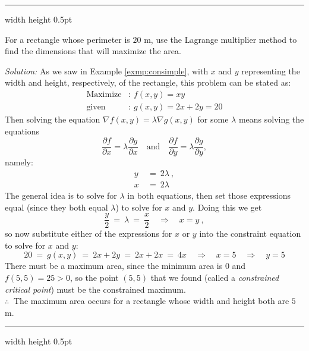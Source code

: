 \medskip
\hrule width \textwidth height 0.5pt
\begin{exmp}\label{exmp:rectlm}
 For a rectangle whose perimeter is $20$ m, use the Lagrange multiplier method to find the dimensions that will
 maximize the area.\smallskip
 \par\noindent \emph{Solution:} As we saw in Example \ref{exmp:consimple}, with $x$ and $y$ representing the width and
  height, respectively, of the rectangle, this problem can be stated as:
 \begin{align*}
  \text{Maximize}&: ~ f(x,y) = xy\\
  \text{given}&: ~ g(x,y) = 2x + 2y = 20
 \end{align*}
 Then solving the equation $\nabla f(x,y) = \lambda \nabla g(x,y)$ for some $\lambda$ means solving the equations
 \[\dfrac{\partial f}{\partial x} = \lambda \dfrac{\partial g}{\partial x}
  \quad
\text{and}
\quad
 \dfrac{\partial f}{\partial y} = \lambda \dfrac{\partial g}{\partial y},\] namely:
 \begin{align*}
  y ~&=~ 2\lambda ~,\\
  x ~&=~ 2\lambda
 \end{align*}
 The general idea is to solve for $\lambda$ in both equations, then set those expressions equal (since they both equal
 $\lambda$) to solve for $x$ and $y$. Doing this we get
 \begin{displaymath}
  \frac{y}{2} ~=~ \lambda ~=~ \frac{x}{2} \quad \Rightarrow \quad x = y ~,
 \end{displaymath}
 so now substitute either of the expressions for $x$ or $y$ into the constraint equation to solve for $x$ and $y$:
 \begin{displaymath}
  20 ~=~ g(x,y) ~=~ 2x + 2y ~= ~2x + 2x ~=~ 4x \quad \Rightarrow \quad x = 5 \quad \Rightarrow \quad y = 5
 \end{displaymath}
 There must be a maximum area, since the minimum area is $0$ and $f(5,5) = 25 > 0$, so the point $(5,5)$ that we found
 (called a \emph{constrained critical point}) must be the constrained maximum.\\
 $\therefore ~$ 
 The maximum area occurs for a rectangle whose width and height both are $5$ m.
\end{exmp}
\hrule width \textwidth height 0.5pt
